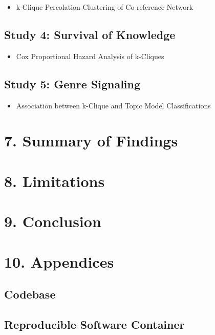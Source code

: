 \begin{itemize}
\tightlist
\item
  k-Clique Percolation Clustering of Co-reference Network
\end{itemize}

\subsection{Study 4: Survival of
Knowledge}\label{study-4-survival-of-knowledge}

\begin{itemize}
\tightlist
\item
  Cox Proportional Hazard Analysis of k-Cliques
\end{itemize}

\subsection{Study 5: Genre Signaling}\label{study-5-genre-signaling}

\begin{itemize}
\tightlist
\item
  Association between k-Clique and Topic Model Classifications
\end{itemize}

\section{7. Summary of Findings}\label{summary-of-findings}

\section{8. Limitations}\label{limitations}

\section{9. Conclusion}\label{conclusion}

\section{10. Appendices}\label{appendices}

\subsection{Codebase}\label{codebase}

\subsection{Reproducible Software
Container}\label{reproducible-software-container}
